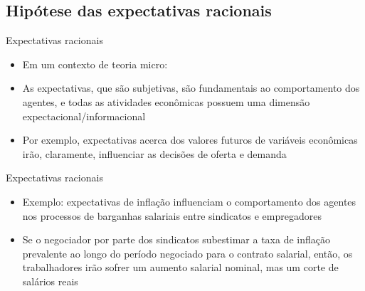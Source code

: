 \documentclass[10pt]{beamer}
\begin{document}
\subsection{Hipótese das expectativas racionais}
\begin{frame}{Expectativas racionais}
    \begin{itemize}
        \item Em um contexto de teoria micro:
        
        \bigskip
        \item As expectativas, que são subjetivas, são fundamentais ao comportamento dos agentes, e todas as atividades econômicas possuem uma dimensão expectacional/informacional
        \bigskip
        \item Por exemplo, expectativas acerca dos valores futuros de variáveis econômicas irão, claramente, influenciar as decisões de oferta e demanda
    \end{itemize}
\end{frame}

\begin{frame}{Expectativas racionais}
    \begin{itemize}
        \item Exemplo: expectativas de inflação influenciam o comportamento dos agentes nos processos de barganhas salariais entre sindicatos e empregadores
        \bigskip
        \item Se o negociador por parte dos sindicatos subestimar a taxa de inflação prevalente ao longo do período negociado para o contrato salarial, então, os trabalhadores irão sofrer um aumento salarial nominal, mas um corte de salários reais
    \end{itemize}
\end{frame}
\end{document}
